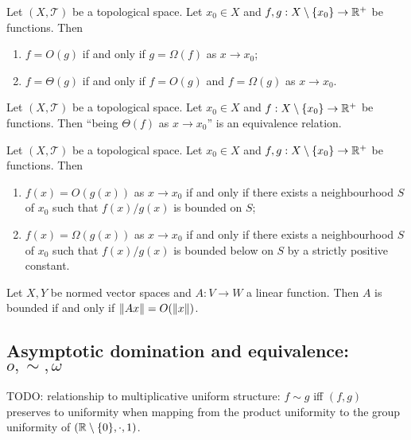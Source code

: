 \begin{lemma}
Let $(X,\mathcal{T})$ be a topological space. Let $x_0 \in X$ and $f,g: X\setminus\{x_0\}\to \mathbb{R}^+$ be functions. Then
\begin{enumerate}
\item $f = O(g)$ \textup{if and only if} $g = \Omega(f)$ as $x\to x_0$;
\item $f = \Theta(g)$ \textup{if and only if} $f = O(g)$ and $f = \Omega(g)$ as $x\to x_0$.
\end{enumerate}
\end{lemma}

\begin{lemma}
Let $(X,\mathcal{T})$ be a topological space. Let $x_0 \in X$ and $f: X\setminus\{x_0\}\to \mathbb{R}^+$ be functions. Then ``being $\Theta(f)$ as $x\to x_0$'' is an equivalence relation.
\end{lemma}

\begin{lemma}
Let $(X,\mathcal{T})$ be a topological space. Let $x_0 \in X$ and $f,g: X\setminus\{x_0\}\to \mathbb{R}^+$ be functions. Then
\begin{enumerate}
\item $f(x) = O(g(x))$ as $x\to x_0$ \textup{if and only if} there exists a neighbourhood $S$ of $x_0$ such that $f(x)/g(x)$ is bounded on $S$;
\item $f(x) = \Omega(g(x))$ as $x\to x_0$ \textup{if and only if} there exists a neighbourhood $S$ of $x_0$ such that $f(x)/g(x)$ is bounded below on $S$ by a strictly positive constant.
\end{enumerate}
\end{lemma}

\begin{lemma} \label{asymptoticsBoundedFunctionNormedSpaces}
Let $X,Y$ be normed vector spaces and $A: V\to W$ a linear function. Then $A$ is bounded \textup{if and only if} $\lVert Ax\rVert = O(\lVert x\rVert)$.
\end{lemma}

\subsection{Asymptotic domination and equivalence: $o,\sim,\omega$}

TODO: relationship to multiplicative uniform structure: $f \sim g$ iff $(f,g)$ preserves to uniformity when mapping from the product uniformity to the group uniformity of $\sSet{\R\setminus\{0\}, \cdot, 1}$.

